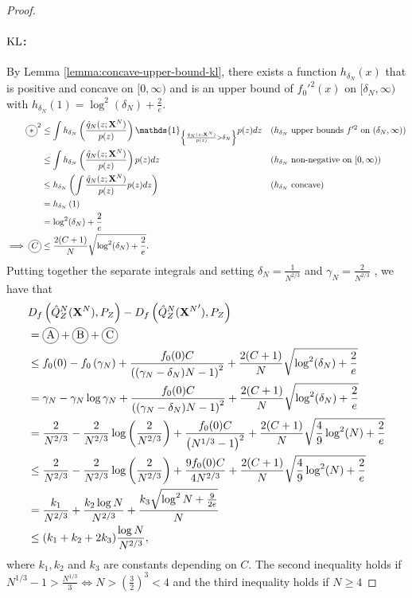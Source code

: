 \begin{proof}
\paragraph{$\mathrm{KL}$:}
By Lemma \ref{lemma:concave-upper-bound-kl}, there exists a function $h_{\delta_N}(x)$ that is positive and concave on $[0, \infty)$ and is an upper bound of $f_0'^2(x)$ on $[\delta_N, \infty)$ with $h_{\delta_N}(1) = \log^2(\delta_N) + \frac{2}{e}$.
%
\begin{align*}
    \encircle{$*$}^2
    &\leq \int h_{\delta_N}\left(\frac{\hat{q}_N(z;\XN)}{p(z)} \right) \mathds{1}_{\left\lbrace \frac{\hat{q}_N(z;\XN)}{p(z)} > \delta_N \right\rbrace} p(z) dz
    && \text{($h_{\delta_N}$ upper bounds $f'^2$ on $(\delta_N, \infty)$)}
    \\
    &\leq \int h_{\delta_N}\left(\frac{\hat{q}_N(z;\XN)}{p(z)} \right) p(z) dz
    && \text{($h_{\delta_N}$ non-negative on $[0, \infty)$)}
    \\
    &\leq  h_{\delta_N}\left( \int \frac{\hat{q}_N(z;\XN)}{p(z)} p(z) dz \right) 
    && \text{($h_{\delta_N}$ concave)}
    \\
    &= h_{\delta_N}\left( 1\right) \\
    &= \log^2(\delta_N) + \frac{2}{e}\\
    \implies \encircle{$C$} &\leq \frac{2(C+1)}{N}\sqrt{\log^2(\delta_N) + \frac{2}{e}}.
\end{align*}
%
Putting together the separate integrals and setting $\delta_N = \frac{1}{N^{2/3}}$ and $\gamma_N = \frac{2}{N^{2/3}}$ , we have that
%
\begin{align*}
    &D_f\left( \hat{Q}_Z^N(\XN) , P_Z\right) - D_f\left( \hat{Q}_Z^N({\XN}') , P_Z\right) \\
    &= \encircle{A} + \encircle{B} + \encircle{C} \\
    &\leq f_0(0) - f_0\left(\gamma_N\right) +  \frac{f_0(0)C}{\left((\gamma_N-\delta_N)N - 1\right)^2} + \frac{2(C+1)}{N} \sqrt{\log^2(\delta_N) + \frac{2}{e} } \\
    &= \gamma_N - \gamma_N \log \gamma_N + \frac{f_0(0)C}{\left((\gamma_N-\delta_N)N - 1\right)^2} + \frac{2(C+1)}{N}  \sqrt{\log^2(\delta_N) + \frac{2}{e}}\\
    &=\frac{2}{N^{2/3}} - \frac{2}{N^{2/3}} \log\left(\frac{2}{N^{2/3}} \right) + \frac{f_0(0)C}{\left(N^{1/3} - 1\right)^2} + \frac{2(C+1)}{N} \sqrt{\frac{4}{9}\log^2(N) + \frac{2}{e}} 
    \\
    &\leq\frac{2}{N^{2/3}} - \frac{2}{N^{2/3}} \log\left(\frac{2}{N^{2/3}} \right) + \frac{9f_0(0)C}{4N^{2/3}} + \frac{2(C+1)}{N} \sqrt{\frac{4}{9}\log^2(N) + \frac{2}{e}} 
    \\
    &= \frac{k_1}{N^{2/3}} + \frac{k_2 \log N}{N^{2/3}} + \frac{k_3 \sqrt{\log^2N + \frac{9}{2e}}}{N}\\
    &\leq (k_1+k_2+2k_3)\frac{\log N}{N^{2/3}},
\end{align*}
where $k_1, k_2$ and $k_3$ are constants depending on $C$.
The second inequality holds if $N^{1/3}-1 > \frac{N^{1/3}}{3} \iff N>\left(\frac{3}{2}\right)^3 < 4$ and the third inequality holds if $N\geq 4$


\end{proof}
